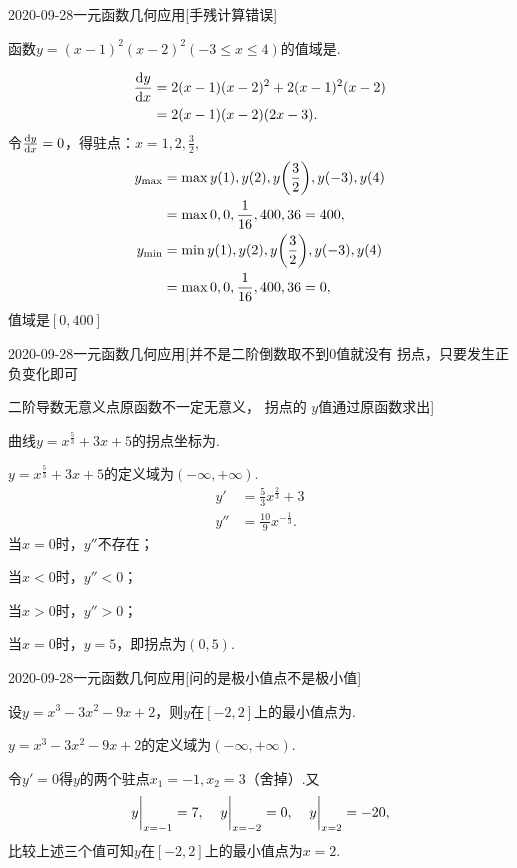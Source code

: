 \documentclass{ctexart}
\begin{document}
\begin{mathques}{2020-09-28}{一元函数几何应用}[手残计算错误]
\begin{ques}
  函数$y = (x - 1)^2 (x - 2)^2 (-3 \le x \le 4)$的值域是\mathblank.
\end{ques}
\begin{solu}
  \answer{$[0, 400]$}
  \begin{align*}
    \dv{y}{x} &= 2 (x - 1) (x - 2)^2 + 2(x - 1)^2 (x - 2) \\
    &= 2(x - 1) (x - 2) (2x - 3).
  \end{align*}
  令$\dv{y}{x} = 0$，得驻点：$x = 1, 2, \frac{3}{2},$
  \begin{align*}
    y_{\max} &= \max{y(1), y(2), y\qty(\frac{3}{2}), y(-3), y(4)} \\
    &= \max{0, 0, \frac{1}{16}, 400, 36} = 400, \\
    y_{\min} &= \min{y(1), y(2), y\qty(\frac{3}{2}), y(-3), y(4)} \\
    &= \max{0, 0, \frac{1}{16}, 400, 36} = 0,
  \end{align*}
  值域是$[0, 400]$
\end{solu}
\end{mathques}

\begin{mathques}{2020-09-28}{一元函数几何应用}[并不是二阶倒数取不到$0$值就没有
  拐点，只要发生正负变化即可\par 二阶导数无意义点原函数不一定无意义， 拐点的
  $y$值通过原函数求出]
\begin{ques}
  曲线$y = x^{\frac{5}{3}} + 3x + 5$的拐点坐标为\mathblank.
\end{ques}
\begin{solu}

  $y = x^{\frac{5}{3}} + 3x + 5$的定义域为$(-\infty, +\infty)$.
  \begin{align*}
    y' &= \frac{5}{3}x^{\frac{2}{3}} + 3 \\
    y'' &= \frac{10}{9}x^{-\frac{1}{3}}.
  \end{align*}
  当$x = 0$时，$y''$不存在；

  当$x < 0$时，$y'' < 0$；

  当$x > 0$时，$y'' > 0$；

  当$x = 0$时，$y = 5$，即拐点为$(0, 5)$.
\end{solu}
\end{mathques}

\begin{mathques}{2020-09-28}{一元函数几何应用}[问的是极小值点不是极小值]
\begin{ques}
  设$y = x^3 - 3x^2 - 9x + 2$，则$y$在$[-2, 2]$上的最小值点为\mathblank.
\end{ques}
\begin{solu}

  $y = x^3 - 3x^2 - 9x + 2$的定义域为$(-\infty, +\infty)$.

  令$y' = 0$得$y$的两个驻点$x_1 = -1, x_2 = 3（舍掉）.$又
  \[
    \eval{y}_{x = -1} = 7\qc \eval{y}_{x = -2} = 0 \qc \eval{y}_{x = 2} = -20,
  \]
  比较上述三个值可知$y$在$[-2, 2]$上的最小值点为$x = 2.$
\end{solu}
\end{mathques}
\end{document}
